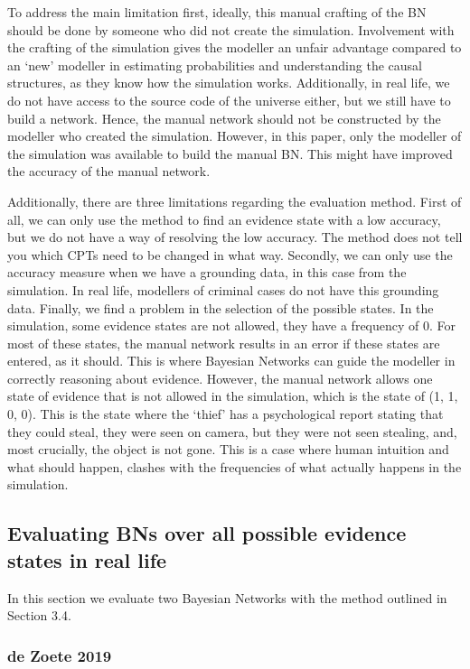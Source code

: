 \documentclass[12pt]{article}
\begin{document}
To address the main limitation first, ideally, this manual crafting of the BN should be done by someone who did not create the simulation. Involvement with the crafting of the simulation gives the modeller an unfair advantage compared to an `new' modeller in estimating probabilities and understanding the causal structures, as they know how the simulation works. Additionally, in real life, we do not have access to the source code of the universe either, but we still have to build a network. Hence, the manual network should not be constructed by the modeller who created the simulation. However, in this paper, only the modeller of the simulation was available to build the manual BN. This might have improved the accuracy of the manual network.

Additionally, there are three limitations regarding the evaluation method. First of all, we can only use the method to find an evidence state with a low accuracy, but we do not have a way of resolving the low accuracy. The method does not tell you which CPTs need to be changed in what way. Secondly, we can only use the accuracy measure when we have a grounding data, in this case from the simulation. In real life, modellers of criminal cases do not have this grounding data. Finally, we find a problem in the selection of the possible states. In the simulation, some evidence states are not allowed, they have a frequency of 0. For most of these states, the manual network results in an error if these states are entered, as it should. This is where Bayesian Networks can guide the modeller in correctly reasoning about evidence. However, the manual network allows one state of evidence that is not allowed in the simulation, which is the state of (1, 1, 0, 0). This is the state where the `thief' has a psychological report stating that they could steal, they were seen on camera, but they were not seen stealing, and, most crucially, the object is not gone. This is a case where human intuition and what should happen, clashes with the frequencies of what actually happens in the simulation.


\subsection{Evaluating BNs over all possible evidence states in real life}

In this section we evaluate two Bayesian Networks with the method outlined in Section 3.4. 

 \subsubsection{de Zoete 2019}
 
\end{document}
